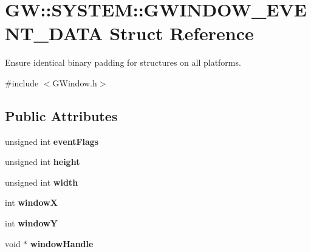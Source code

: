\hypertarget{struct_g_w_1_1_s_y_s_t_e_m_1_1_g_w_i_n_d_o_w___e_v_e_n_t___d_a_t_a}{}\section{GW\+:\+:S\+Y\+S\+T\+EM\+:\+:G\+W\+I\+N\+D\+O\+W\+\_\+\+E\+V\+E\+N\+T\+\_\+\+D\+A\+TA Struct Reference}
\label{struct_g_w_1_1_s_y_s_t_e_m_1_1_g_w_i_n_d_o_w___e_v_e_n_t___d_a_t_a}


Ensure identical binary padding for structures on all platforms.  




{\ttfamily \#include $<$G\+Window.\+h$>$}

\subsection*{Public Attributes}
\begin{DoxyCompactItemize}
\item 
\mbox{\label{struct_g_w_1_1_s_y_s_t_e_m_1_1_g_w_i_n_d_o_w___e_v_e_n_t___d_a_t_a_a9a3463e7fe90f6c9cb4c4f7d68f62ee1}} 
unsigned int {\bfseries event\+Flags}
\item 
\mbox{\label{struct_g_w_1_1_s_y_s_t_e_m_1_1_g_w_i_n_d_o_w___e_v_e_n_t___d_a_t_a_a1bd478c20e20d67fcef4278888f29225}} 
unsigned int {\bfseries height}
\item 
\mbox{\label{struct_g_w_1_1_s_y_s_t_e_m_1_1_g_w_i_n_d_o_w___e_v_e_n_t___d_a_t_a_aedd64cb9564e161fc24a9ea597576dc9}} 
unsigned int {\bfseries width}
\item 
\mbox{\label{struct_g_w_1_1_s_y_s_t_e_m_1_1_g_w_i_n_d_o_w___e_v_e_n_t___d_a_t_a_acb671b49c59e58b84d797e5c3ac6deaf}} 
int {\bfseries windowX}
\item 
\mbox{\label{struct_g_w_1_1_s_y_s_t_e_m_1_1_g_w_i_n_d_o_w___e_v_e_n_t___d_a_t_a_aaf455dc933271e4ba81225b8b0433ebc}} 
int {\bfseries windowY}
\item 
\mbox{\label{struct_g_w_1_1_s_y_s_t_e_m_1_1_g_w_i_n_d_o_w___e_v_e_n_t___d_a_t_a_a08f52d27570c3cad613dd19fe72a88ac}} 
void $\ast$ {\bfseries window\+Handle}
\end{DoxyCompactItemize}


